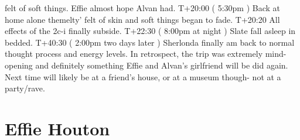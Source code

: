 \documentclass[12pt]{book}
\begin{document}
felt of soft things. Effie almost hope Alvan had. T+20:00 ( 5:30pm ) Back at home alone themelty' felt of skin and soft things began to fade. T+20:20 All effects of the 2c-i finally subside. T+22:30 ( 8:00pm at night ) Slate fall asleep in bedded. T+40:30 ( 2:00pm two days later ) Sherlonda finally am back to normal thought process and energy levels. In retrospect, the trip was extremely mind-opening and definitely something Effie and Alvan's girlfriend will be did again. Next time will likely be at a friend's house, or at a museum though- not at a party/rave.



\chapter{Effie Houton}
\end{document}
